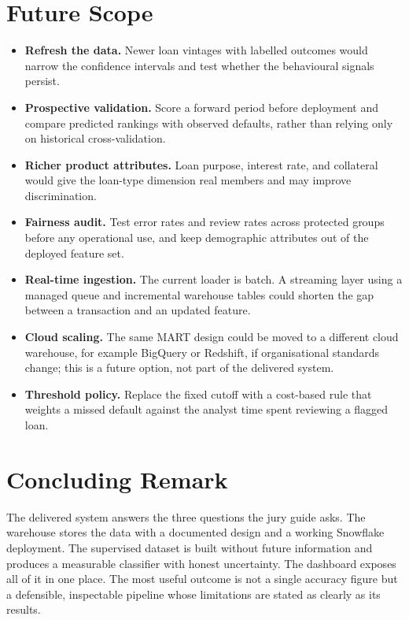 \section{Future Scope}
\begin{itemize}
    \item \textbf{Refresh the data.} Newer loan vintages with labelled outcomes would narrow the confidence intervals and test whether the behavioural signals persist.
    \item \textbf{Prospective validation.} Score a forward period before deployment and compare predicted rankings with observed defaults, rather than relying only on historical cross-validation.
    \item \textbf{Richer product attributes.} Loan purpose, interest rate, and collateral would give the loan-type dimension real members and may improve discrimination.
    \item \textbf{Fairness audit.} Test error rates and review rates across protected groups before any operational use, and keep demographic attributes out of the deployed feature set.
    \item \textbf{Real-time ingestion.} The current loader is batch. A streaming layer using a managed queue and incremental warehouse tables could shorten the gap between a transaction and an updated feature.
    \item \textbf{Cloud scaling.} The same MART design could be moved to a different cloud warehouse, for example BigQuery or Redshift, if organisational standards change; this is a future option, not part of the delivered system.
    \item \textbf{Threshold policy.} Replace the fixed cutoff with a cost-based rule that weights a missed default against the analyst time spent reviewing a flagged loan.
\end{itemize}

\section{Concluding Remark}
The delivered system answers the three questions the jury guide asks. The warehouse stores the data with a documented design and a working Snowflake deployment. The supervised dataset is built without future information and produces a measurable classifier with honest uncertainty. The dashboard exposes all of it in one place. The most useful outcome is not a single accuracy figure but a defensible, inspectable pipeline whose limitations are stated as clearly as its results.
